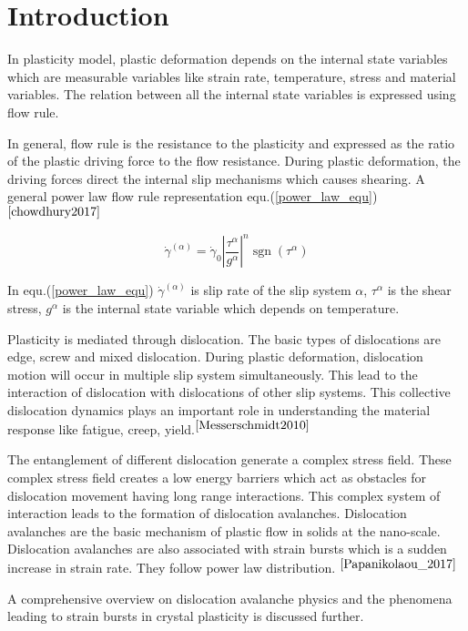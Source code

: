 \section{Introduction}
	In plasticity model, plastic deformation depends on the internal state variables which are measurable variables like strain rate, temperature, stress and material variables. The relation between all the internal state variables is expressed using flow rule.
	
In general, flow rule is the resistance to the plasticity and expressed as the ratio of the plastic driving force to the flow resistance. During plastic deformation, the driving forces direct the internal slip mechanisms which causes shearing. A general power law flow rule representation equ.(\ref{power_law_equ})$^{\cite{chowdhury2017}}$ \par

\begin{equation}\label{power_law_equ}
\dot{\gamma}^{(\alpha)}=\dot{\gamma}_{0}\left|\frac{\tau^{\alpha}}{g^{\alpha}}\right|^{n} \operatorname{sgn}\left(\tau^{\alpha}\right)
\end{equation}

In equ.(\ref{power_law_equ}) $\dot{\gamma}^{(\alpha)}$ is slip rate of the slip system $\alpha$, $\tau^{\alpha}$ is the shear stress, $g^{\alpha}$ is the internal state variable which depends on temperature.

Plasticity is mediated through dislocation. The basic types of dislocations are edge, screw and mixed dislocation. During plastic deformation, dislocation motion will occur in multiple slip system simultaneously. This lead to the interaction of dislocation with dislocations of other slip systems. This collective dislocation dynamics plays an important role in understanding the material response like fatigue, creep, yield.$^{\cite{Messerschmidt2010}}$ 

The entanglement of different dislocation generate a complex stress field. These complex stress field creates a low energy barriers which act as obstacles for dislocation movement having long range interactions. This complex system of interaction leads to the formation of dislocation avalanches. Dislocation avalanches are the basic mechanism of plastic flow in solids at the nano-scale. Dislocation avalanches are also associated with strain bursts which is a sudden increase in strain rate.
They follow power law distribution.
$^{\cite{Papanikolaou_2017}}$

A comprehensive overview on dislocation avalanche physics and the phenomena leading to strain bursts in crystal plasticity is discussed further.




